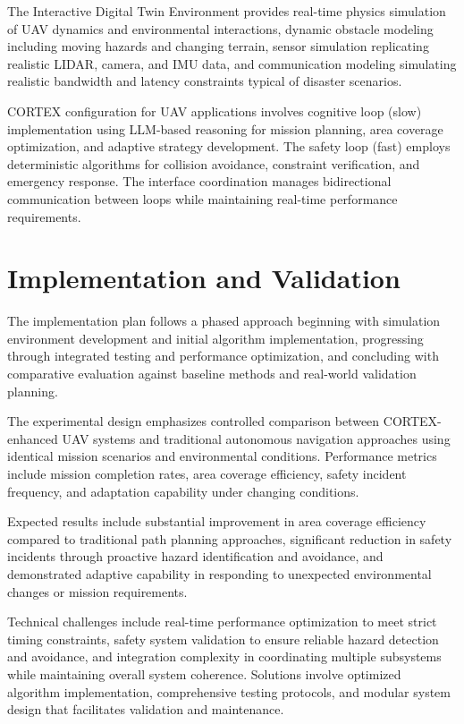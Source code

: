 The Interactive Digital Twin Environment provides real-time physics simulation of UAV dynamics and environmental interactions, dynamic obstacle modeling including moving hazards and changing terrain, sensor simulation replicating realistic LIDAR, camera, and IMU data, and communication modeling simulating realistic bandwidth and latency constraints typical of disaster scenarios.

CORTEX configuration for UAV applications involves cognitive loop (slow) implementation using LLM-based reasoning for mission planning, area coverage optimization, and adaptive strategy development. The safety loop (fast) employs deterministic algorithms for collision avoidance, constraint verification, and emergency response. The interface coordination manages bidirectional communication between loops while maintaining real-time performance requirements.

\section{Implementation and Validation}

The implementation plan follows a phased approach beginning with simulation environment development and initial algorithm implementation, progressing through integrated testing and performance optimization, and concluding with comparative evaluation against baseline methods and real-world validation planning.

The experimental design emphasizes controlled comparison between CORTEX-enhanced UAV systems and traditional autonomous navigation approaches using identical mission scenarios and environmental conditions. Performance metrics include mission completion rates, area coverage efficiency, safety incident frequency, and adaptation capability under changing conditions.

Expected results include substantial improvement in area coverage efficiency compared to traditional path planning approaches, significant reduction in safety incidents through proactive hazard identification and avoidance, and demonstrated adaptive capability in responding to unexpected environmental changes or mission requirements.

Technical challenges include real-time performance optimization to meet strict timing constraints, safety system validation to ensure reliable hazard detection and avoidance, and integration complexity in coordinating multiple subsystems while maintaining overall system coherence. Solutions involve optimized algorithm implementation, comprehensive testing protocols, and modular system design that facilitates validation and maintenance.

